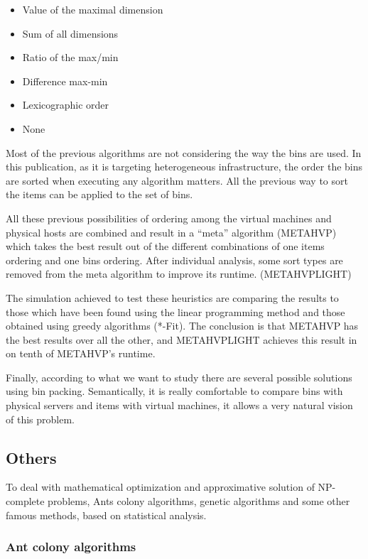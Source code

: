\documentclass[a4paper,11pt]{article}
\begin{document}
\begin{itemize}
	\item Value of the maximal dimension
	\item Sum of all dimensions
	\item Ratio of the max/min
	\item Difference max-min
	\item Lexicographic order
	\item None
\end{itemize}

Most of the previous algorithms are not considering the way the bins are used.
In this publication, as it is targeting heterogeneous infrastructure, the order
the bins are sorted when executing any algorithm matters. All the previous way to
sort the items can be applied to the set of bins.

All these previous possibilities of ordering among the virtual machines and physical
hosts are combined and result in a “meta” algorithm (METAHVP) which takes the best result
out of the different combinations of one items ordering and one bins ordering. After
individual analysis, some sort types are removed from the meta algorithm to improve
its runtime. (METAHVPLIGHT)

The simulation achieved to test these heuristics are comparing the results to those
which have been found using the linear programming method and those obtained using
greedy algorithms (*-Fit). The conclusion is that METAHVP has the best results over
all the other, and METAHVPLIGHT achieves this result in on tenth of METAHVP's runtime.

Finally, according to what we want to study there are several possible solutions using
bin packing. Semantically, it is really comfortable to compare bins with physical servers
and items with virtual machines, it allows a very natural vision of this problem.

\subsection{Others}

To deal with mathematical optimization and approximative solution of NP-complete problems,
Ants colony algorithms, genetic algorithms and some other famous methods, based on statistical
analysis.

\subsubsection{Ant colony algorithms}
\end{document}
